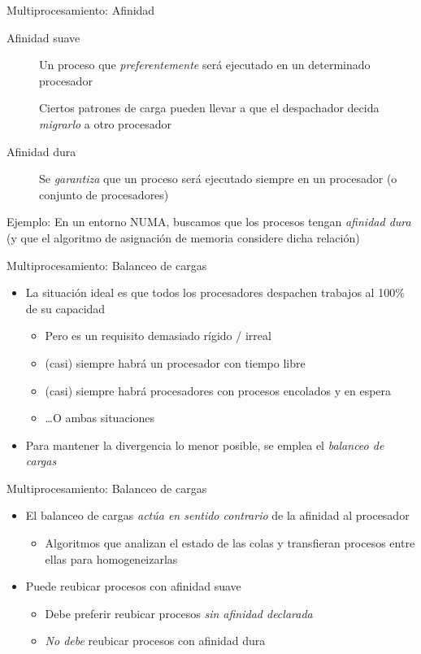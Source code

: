 \documentclass[presentation]{beamer}
\begin{document}
\begin{frame}[label={sec:orga0fc405}]{Multiprocesamiento: Afinidad}
\begin{description}
\item[{Afinidad suave}] Un proceso que \emph{preferentemente} será ejecutado
en un determinado procesador

Ciertos patrones de carga pueden llevar a que el
despachador decida \emph{migrarlo} a otro procesador

\item[{Afinidad dura}] Se \emph{garantiza} que un proceso será ejecutado
siempre en un procesador (o conjunto de
procesadores)
\end{description}

Ejemplo: En un entorno NUMA, buscamos que los procesos tengan
\emph{afinidad dura} (y que el algoritmo de asignación de memoria
considere dicha relación)
\end{frame}

\begin{frame}[label={sec:orga08871f}]{Multiprocesamiento: Balanceo de cargas}
\begin{itemize}
\item La situación ideal es que todos los procesadores despachen trabajos
al 100\% de su capacidad
\begin{itemize}
\item Pero es un requisito demasiado rígido / irreal
\item (casi) siempre habrá un procesador con tiempo libre
\item (casi) siempre habrá procesadores con procesos encolados y en
espera
\item \ldots{}O ambas situaciones
\end{itemize}
\item Para mantener la divergencia lo menor posible, se emplea el
\emph{balanceo de cargas}
\end{itemize}
\end{frame}

\begin{frame}[label={sec:org813d64f}]{Multiprocesamiento: Balanceo de cargas}
\begin{itemize}
\item El balanceo de cargas \emph{actúa en sentido contrario} de la afinidad
al procesador
\begin{itemize}
\item Algoritmos que analizan el estado de las colas y transfieran
procesos entre ellas para homogeneizarlas
\end{itemize}
\item Puede reubicar procesos con afinidad suave
\begin{itemize}
\item Debe preferir reubicar procesos \emph{sin afinidad declarada}
\item \emph{No debe} reubicar procesos con afinidad dura
\end{itemize}
\end{itemize}
\end{frame}
\end{document}
